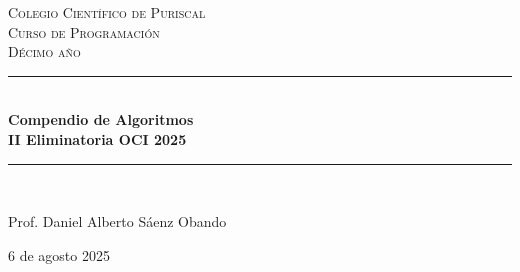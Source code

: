 \begin{titlepage}

\newcommand{\HRule}{\rule{\linewidth}{0.5mm}}

\center


\textsc{\LARGE Colegio Científico de Puriscal}\\[1.5cm]
\textsc{\Large Curso de Programación}\\[0.5cm]
\textsc{\large Décimo año}\\[0.5cm]

\bigskip
\bigskip
\bigskip
\bigskip

\HRule \\[0.4cm]
{ \huge \bfseries Compendio de Algoritmos\\[0.5cm] \LARGE II Eliminatoria OCI 2025}\\[0.4cm]
\HRule \\[1.5cm]


\begin{center} \large
Prof. Daniel Alberto Sáenz Obando\\
\bigskip
\bigskip
\bigskip
\bigskip
\end{center}
\bigskip
\bigskip
\bigskip
\bigskip
\bigskip
\bigskip
\bigskip
\bigskip
\bigskip
\bigskip
\bigskip
\bigskip
\bigskip
\bigskip
\bigskip
\bigskip
\normalsize 6 de agosto 2025 \vspace*{5\baselineskip}
\vfill %

\end{titlepage}
